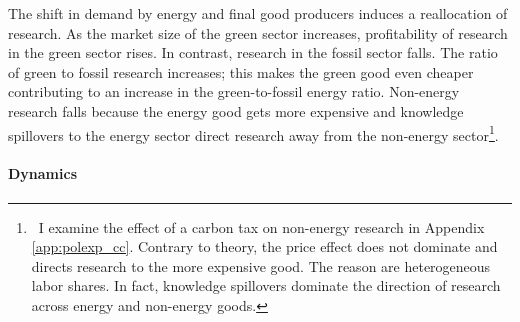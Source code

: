  The shift in demand by energy and final good producers induces a reallocation of research. 
 As the market size of the green sector increases, profitability of research in the green sector rises. In contrast, research in the fossil sector falls. The ratio of green to fossil research increases; this makes the green good even cheaper contributing to an increase in the green-to-fossil energy ratio. Non-energy research falls because the energy good gets more expensive and knowledge spillovers to the energy sector direct research away from the non-energy sector\footnote{\ I examine the effect of a carbon tax on non-energy research in Appendix \ref{app:polexp_cc}. Contrary to theory, the price effect does not dominate and directs research to the more expensive good. The reason are heterogeneous labor shares. In fact, knowledge spillovers dominate the direction of research across energy and non-energy goods.}. 
 
 
 


\paragraph{Dynamics}

